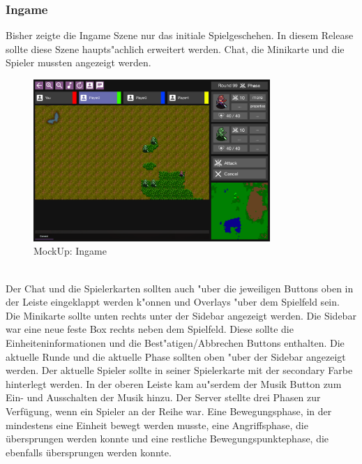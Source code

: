 \documentclass[12pt, titlepage]{scrartcl}
\newcounter{subsubsubsection}[subsubsection]
\begin{document}
		    \subsubsection{Ingame}
		        Bisher zeigte die Ingame Szene nur das initiale Spielgeschehen. In diesem Release sollte diese Szene haupts"achlich erweitert werden. Chat, die Minikarte und die Spieler mussten angezeigt werden. \\
		        \begin{figure}[H] 
    				\centering
    				\includegraphics[width=0.8\textwidth]{images/mockUps/Ingame.png}
    				\caption{MockUp: Ingame}
    				\label{Ingame_View}
			    \end{figure}
		    	\ \\   Der Chat und die Spielerkarten sollten auch "uber die jeweiligen Buttons oben in der Leiste eingeklappt werden k"onnen und Overlays "uber dem Spielfeld sein. Die Minikarte sollte unten rechts unter der Sidebar angezeigt werden. Die Sidebar war eine neue feste Box rechts neben dem Spielfeld. Diese sollte die Einheiteninformationen und die Best"atigen/Abbrechen Buttons enthalten. Die aktuelle Runde und die aktuelle Phase sollten oben "uber der Sidebar angezeigt werden. Der aktuelle Spieler sollte in seiner Spielerkarte mit der secondary Farbe hinterlegt werden. In der oberen Leiste kam au"serdem der Musik Button zum Ein- und Ausschalten der Musik hinzu.
			        Der Server stellte drei Phasen zur Verf\"ugung, wenn ein Spieler an der Reihe war. Eine Bewegungsphase, in der mindestens eine Einheit bewegt werden musste, eine Angriffsphase, die \"ubersprungen werden konnte und eine restliche Bewegungspunktephase, die ebenfalls \"ubersprungen werden konnte. \\
\end{document}
